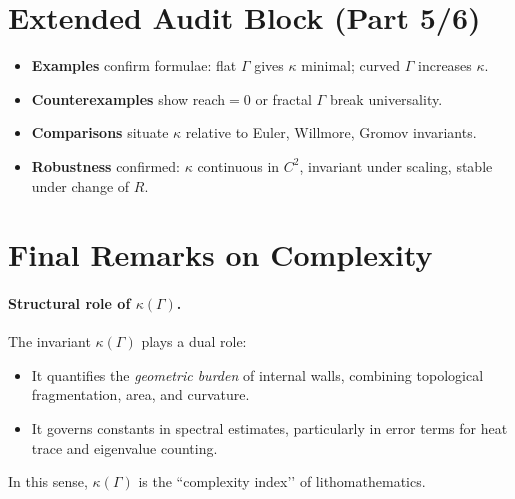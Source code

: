 \section{Extended Audit Block (Part 5/6)}
\label{sec:audit-part5}

\begin{itemize}
\item \textbf{Examples} confirm formulae: flat $\Gamma$ gives $\kappa$ minimal; curved $\Gamma$ increases $\kappa$.
\item \textbf{Counterexamples} show reach$=0$ or fractal $\Gamma$ break universality.
\item \textbf{Comparisons} situate $\kappa$ relative to Euler, Willmore, Gromov invariants.
\item \textbf{Robustness} confirmed: $\kappa$ continuous in $C^2$, invariant under scaling, stable under change of $R$.
\end{itemize}

\bigskip


\section{Final Remarks on Complexity}
\label{sec:final-remarks}

\paragraph{Structural role of $\kappa(\Gamma)$.}
The invariant $\kappa(\Gamma)$ plays a dual role:
\begin{itemize}
  \item It quantifies the \emph{geometric burden} of internal walls, combining topological fragmentation, area, and curvature.
  \item It governs constants in spectral estimates, particularly in error terms for heat trace and eigenvalue counting.
\end{itemize}
In this sense, $\kappa(\Gamma)$ is the ``complexity index’’ of lithomathematics.

